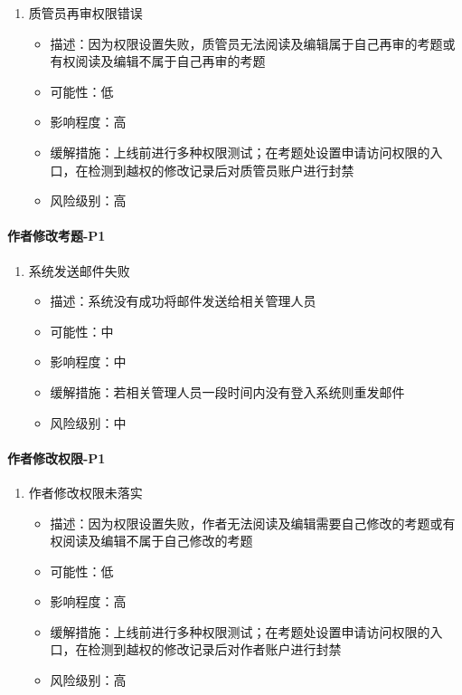 \documentclass[hyperref, a4paper]{ctexart}
\providecommand{\tightlist}{%
  \setlength{\itemsep}{0pt}\setlength{\parskip}{0pt}}
\let\oldparagraph\paragraph
\renewcommand{\paragraph}[1]{\oldparagraph{#1}\mbox{}}
\begin{document}
\begin{enumerate}
\def\labelenumi{\arabic{enumi}.}
\tightlist
\item
  质管员再审权限错误

  \begin{itemize}
  \tightlist
  \item
    描述：因为权限设置失败，质管员无法阅读及编辑属于自己再审的考题或有权阅读及编辑不属于自己再审的考题
  \item
    可能性：低
  \item
    影响程度：高
  \item
    缓解措施：上线前进行多种权限测试；在考题处设置申请访问权限的入口，在检测到越权的修改记录后对质管员账户进行封禁
  \item
    风险级别：高
  \end{itemize}
\end{enumerate}

\hypertarget{ux4f5cux8005ux4feeux6539ux8003ux9898-p1}{%
\paragraph{作者修改考题-P1}\label{ux4f5cux8005ux4feeux6539ux8003ux9898-p1}}

\begin{enumerate}
\def\labelenumi{\arabic{enumi}.}
\tightlist
\item
  系统发送邮件失败

  \begin{itemize}
  \tightlist
  \item
    描述：系统没有成功将邮件发送给相关管理人员
  \item
    可能性：中
  \item
    影响程度：中
  \item
    缓解措施：若相关管理人员一段时间内没有登入系统则重发邮件
  \item
    风险级别：中
  \end{itemize}
\end{enumerate}

\hypertarget{ux4f5cux8005ux4feeux6539ux6743ux9650-p1}{%
\paragraph{作者修改权限-P1}\label{ux4f5cux8005ux4feeux6539ux6743ux9650-p1}}

\begin{enumerate}
\def\labelenumi{\arabic{enumi}.}
\tightlist
\item
  作者修改权限未落实

  \begin{itemize}
  \tightlist
  \item
    描述：因为权限设置失败，作者无法阅读及编辑需要自己修改的考题或有权阅读及编辑不属于自己修改的考题
  \item
    可能性：低
  \item
    影响程度：高
  \item
    缓解措施：上线前进行多种权限测试；在考题处设置申请访问权限的入口，在检测到越权的修改记录后对作者账户进行封禁
  \item
    风险级别：高
  \end{itemize}
\end{enumerate}
\end{document}
